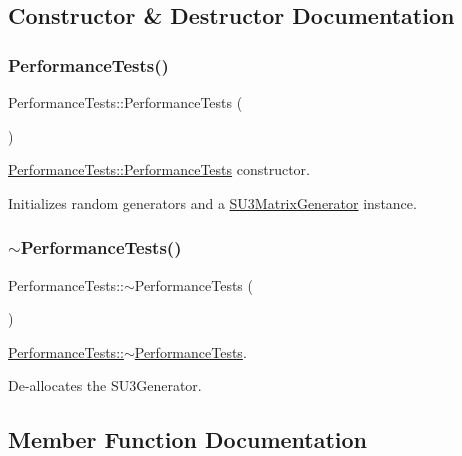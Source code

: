 \subsection{Constructor \& Destructor Documentation}
\mbox{\label{class_performance_tests_ac8c32855dc70f74be063396bd6f76cf4}} 
\subsubsection{\texorpdfstring{PerformanceTests()}{PerformanceTests()}}
{\footnotesize\ttfamily Performance\+Tests\+::\+Performance\+Tests (\begin{DoxyParamCaption}{ }\end{DoxyParamCaption})}



\mbox{\hyperlink{class_performance_tests_ac8c32855dc70f74be063396bd6f76cf4}{Performance\+Tests\+::\+Performance\+Tests}} constructor. 

Initializes random generators and a \mbox{\hyperlink{class_s_u3_matrix_generator}{S\+U3\+Matrix\+Generator}} instance. \mbox{\label{class_performance_tests_adc3a6beb9f16d8442cb9918dd2e9a8bb}} 
\subsubsection{\texorpdfstring{$\sim$PerformanceTests()}{~PerformanceTests()}}
{\footnotesize\ttfamily Performance\+Tests\+::$\sim$\+Performance\+Tests (\begin{DoxyParamCaption}{ }\end{DoxyParamCaption})}



\mbox{\hyperlink{class_performance_tests_adc3a6beb9f16d8442cb9918dd2e9a8bb}{Performance\+Tests\+::$\sim$\+Performance\+Tests}}. 

De-\/allocates the S\+U3\+Generator. 

\subsection{Member Function Documentation}
\mbox{\label{class_performance_tests_aa55ebdbc84db93cc45adfdf7163f90b4}} 
